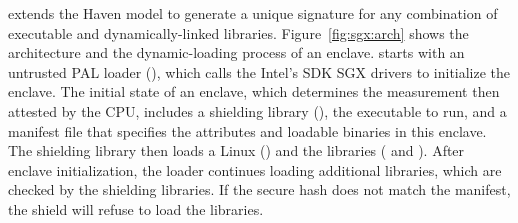 








\graphenesgx{} extends the Haven model to generate a unique signature for
any combination of executable and dynamically-linked libraries.
Figure~\ref{fig:sgx:arch} shows the architecture and the dynamic-loading process
of an enclave. %
\graphenesgx{} starts with an untrusted PAL loader (), which calls the Intel's SDK SGX drivers to initialize the enclave.
The initial state of an enclave, which determines the measurement then 
attested by the CPU, includes a shielding library (),
the executable to run,
and a manifest file that specifies the attributes and loadable binaries in this enclave.
The shielding library then loads a Linux \libos{} () and the \glibc{} libraries ( and ).
After enclave initialization, the loader continues loading
additional libraries, which are checked by the shielding libraries.
If the secure hash does not match the manifest, the shield will refuse to load the libraries.

